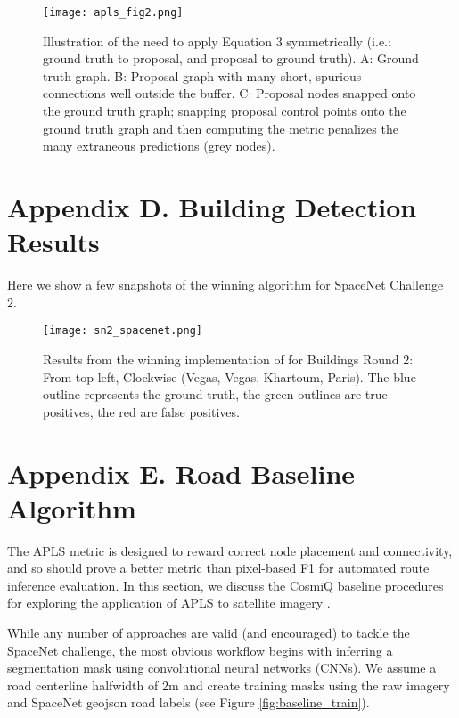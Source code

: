 \documentclass{article}
\begin{document}
\begin{figure}[h]
  \centering
     \texttt{[image: apls\_fig2.png]}
  \caption{Illustration of the need to apply Equation 3 symmetrically (i.e.: ground truth to proposal, and proposal to ground truth). A: Ground truth graph. B: Proposal graph with many short, spurious connections well outside the buffer. C: Proposal nodes snapped onto the ground truth graph; snapping proposal control points onto the ground truth graph and then computing the metric penalizes the many extraneous predictions (grey nodes).}
  \label{fig:apls_fig2}
\end{figure}

\clearpage
\newpage

\section{Appendix D.  Building Detection Results}

Here we show a few snapshots of the winning algorithm for SpaceNet Challenge 2.

\begin{figure}[h]
  \centering
     \texttt{[image: sn2\_spacenet.png]}
  \caption{Results from the winning implementation of  for Buildings Round 2: From top left, Clockwise (Vegas, Vegas, Khartoum, Paris). The blue outline represents the ground truth, the green outlines are true positives, the red are false positives.}
  \label{fig:sn2_spacenet}
\end{figure}

\clearpage
\newpage

\section{Appendix E.  Road Baseline Algorithm}
The APLS metric is designed to reward correct node placement and connectivity, and so should prove a better metric than pixel-based F1 for automated route inference evaluation. In this section, we discuss the CosmiQ baseline procedures for exploring the application of APLS to satellite imagery \cite{basiss}.


While any number of approaches are valid (and encouraged) to tackle the SpaceNet challenge, the most obvious workflow begins with inferring a segmentation mask using convolutional neural networks (CNNs).  We assume a road centerline halfwidth of 2m and create training masks using the raw imagery and SpaceNet geojson road labels (see Figure \ref{fig:baseline_train}).
\end{document}
